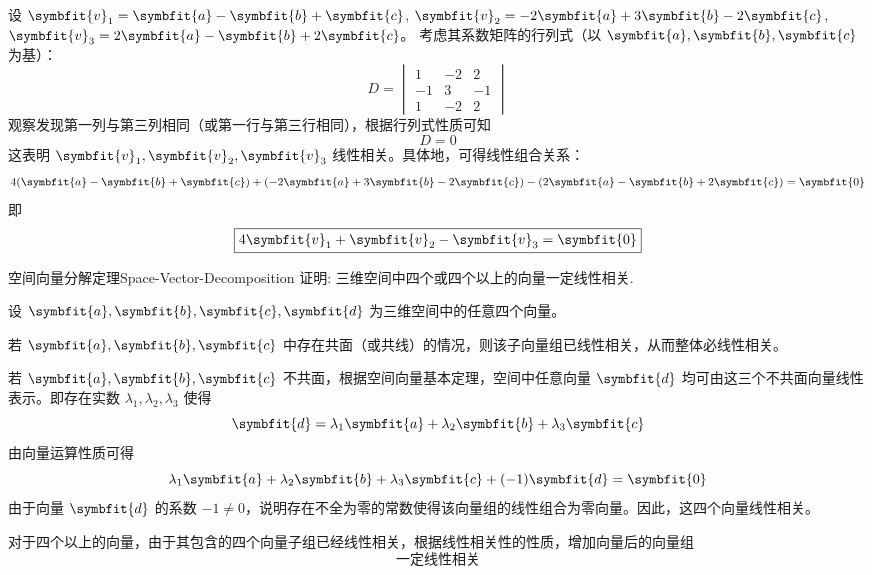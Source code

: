 \begin{myproof}
    设 $\symbfit{v}_1 = \symbfit{a} - \symbfit{b} + \symbfit{c}$, $\symbfit{v}_2 = -2\symbfit{a} + 3\symbfit{b} - 2\symbfit{c}$, $\symbfit{v}_3 = 2\symbfit{a} - \symbfit{b} + 2\symbfit{c}$。
    考虑其系数矩阵的行列式（以 $\symbfit{a}, \symbfit{b}, \symbfit{c}$ 为基）：
    \begin{equation*}
        D = \begin{vmatrix} 1 & -2 & 2 \\ -1 & 3 & -1 \\ 1 & -2 & 2 \end{vmatrix}
    \end{equation*}
    观察发现第一列与第三列相同（或第一行与第三行相同），根据行列式性质可知
    \begin{equation*}
        D = 0
    \end{equation*}
    这表明 $\symbfit{v}_1, \symbfit{v}_2, \symbfit{v}_3$ 线性相关。具体地，可得线性组合关系：
    \begin{equation*}
        4(\symbfit{a} - \symbfit{b} + \symbfit{c}) + (-2\symbfit{a} + 3\symbfit{b} - 2\symbfit{c}) - (2\symbfit{a} - \symbfit{b} + 2\symbfit{c}) = \symbfit{0}
    \end{equation*}
    即
    \begin{equation*}
        \boxed{4\symbfit{v}_1 + \symbfit{v}_2 - \symbfit{v}_3 = \symbfit{0}}
    \end{equation*}
\end{myproof}


\begin{problem}{空间向量分解定理}{Space-Vector-Decomposition}
    证明: 三维空间中四个或四个以上的向量一定线性相关.
\end{problem}

\begin{myproof}
    设 $\symbfit{a}, \symbfit{b}, \symbfit{c}, \symbfit{d}$ 为三维空间中的任意四个向量。

    若 $\symbfit{a}, \symbfit{b}, \symbfit{c}$ 中存在共面（或共线）的情况，则该子向量组已线性相关，从而整体必线性相关。

    若 $\symbfit{a}, \symbfit{b}, \symbfit{c}$ 不共面，根据空间向量基本定理，空间中任意向量 $\symbfit{d}$ 均可由这三个不共面向量线性表示。即存在实数 $\lambda_1, \lambda_2, \lambda_3$ 使得
    \begin{equation*}
        \symbfit{d} = \lambda_1\symbfit{a} + \lambda_2\symbfit{b} + \lambda_3\symbfit{c}
    \end{equation*}
    由向量运算性质可得
    \begin{equation*}
        \lambda_1\symbfit{a} + \lambda_2\symbfit{b} + \lambda_3\symbfit{c} + (-1)\symbfit{d} = \symbfit{0}
    \end{equation*}
    由于向量 $\symbfit{d}$ 的系数 $-1 \neq 0$，说明存在不全为零的常数使得该向量组的线性组合为零向量。因此，这四个向量线性相关。

    对于四个以上的向量，由于其包含的四个向量子组已经线性相关，根据线性相关性的性质，增加向量后的向量组
    \begin{equation*}
        \boxed{\text{一定线性相关}}
    \end{equation*}
\end{myproof}


